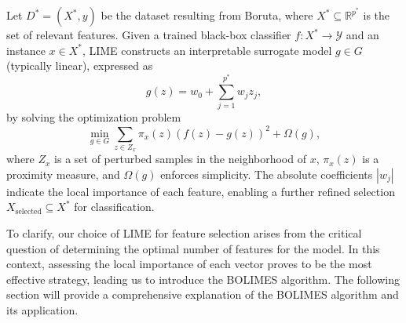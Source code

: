 \begin{definition}
Let \( D^* = (X^*, y) \) be the dataset resulting from Boruta, where \( X^* \subseteq \mathbb{R}^{p^*} \) is the set of relevant features. Given a trained black-box classifier \( f: X^* \to \mathcal{Y} \) and an instance \( x \in X^* \), LIME constructs an interpretable surrogate model \( g \in G \) (typically linear), expressed as
\[
g(z) = w_0 + \sum_{j=1}^{p^*} w_j z_j,
\]
by solving the optimization problem
\[
\min_{g \in G} \sum_{z \in Z_x} \pi_x(z) \left( f(z) - g(z) \right)^2 + \Omega(g),
\]
where \( Z_x \) is a set of perturbed samples in the neighborhood of \( x \), \( \pi_x(z) \) is a proximity measure, and \( \Omega(g) \) enforces simplicity. The absolute coefficients \( |w_j| \) indicate the local importance of each feature, enabling a further refined selection \( X_{\text{selected}} \subseteq X^* \) for classification.
\end{definition}


To clarify, our choice of LIME for feature selection arises from the critical question of determining the optimal number of features for the model. In this context, assessing the local importance of each vector proves to be the most effective strategy, leading us to introduce the BOLIMES algorithm. The following section will provide a comprehensive explanation of the BOLIMES algorithm and its application.





